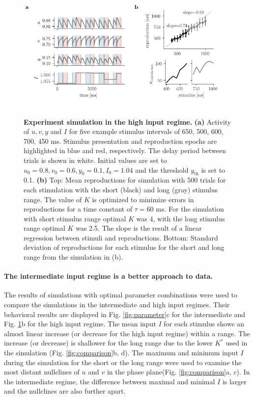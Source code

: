 \documentclass[10pt]{article}
\begin{document}
\begin{figure}[ht]
	\centering
	\includegraphics{figures/highI.pdf}
	\caption{\textbf{Experiment simulation in the high input regime.} 
	\textbf{(a)} Activity of $u, v, y$ and $I$ for five example stimulus intervals of 650, 500, 600, 700, 450 ms. Stimulus presentation and reproduction epochs are highlighted in blue and red, respectively. The delay period between trials is shown in white. Initial values are set to $u_0=0.8 , v_0=0.6 , y_0=0.1, I_0=1.04$ and the threshold $y_{\text{th}}$ is set to 0.1. 
	\textbf{(b)} Top: Mean reproductions for simulation with 500 trials for each stimulation with the short (black) and long (gray) stimulus range. The value of $K$ is optimized to minimize errors in reproductions for a time constant of $\tau = 60$ ms. For the simulation with short stimulus range optimal $K$ was 4, with the long stimulus range optimal $K$ was 2.5.
		The slope is the result of a linear regression between stimuli and reproductions.
		Bottom: Standard deviation of reproductions for each stimulus for the short and long range from the simulation in (b).
	}
\label{highI}
\end{figure}

\paragraph{The intermediate input regime is a better approach to data.}%
The results of simulations with optimal parameter combinations were used to compare the simulations in the intermediate and high input regimes.
Their behavioral results are displayed in Fig. \ref{fig:parameter}c for the intermediate and Fig. \ref{highI}b for the high input regime.
The mean input $I$ for each stimulus shows an almost linear increase (or decrease for the high input regime) within a range. The increase (or decrease) is shallower for the long range due to the lower $K^*$ used in the simulation (Fig. \ref{fig:comparison}b, d).
The maximum and minimum input $I$ during the simulation for the short or the long range were used to examine the most distant nullclines of $u$ and $v$ in the phase plane(Fig. \ref{fig:comparison}a, c). 
In the intermediate regime, the difference between maximal and minimal $I$ is larger and the nullclines are also further apart.
\end{document}

